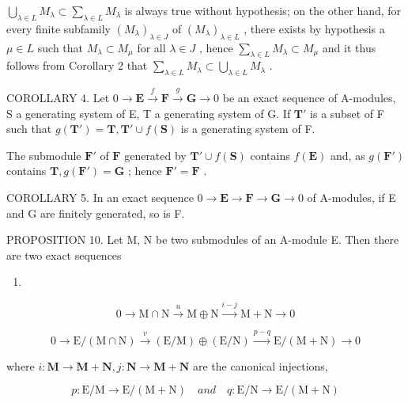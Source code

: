 \(\bigcup_{\lambda \in L} M_{\lambda} \subset \sum_{\lambda \in L} M_{\lambda}\) is always true without hypothesis; on the other hand, for every finite subfamily \((M_{\lambda})_{\lambda \in J}\) of \((M_{\lambda})_{\lambda \in L}\) , there exists by hypothesis a \(\mu \in L\) such that \(M_{\lambda} \subset M_{\mu}\) for all \(\lambda \in J\) , hence \(\sum_{\lambda \in L} M_{\lambda} \subset M_{\mu}\) and it thus follows from Corollary 2 that \(\sum_{\lambda \in L} M_{\lambda} \subset \bigcup_{\lambda \in L} M_{\lambda}\) .

COROLLARY 4. Let \(0 \to \mathbf{E} \xrightarrow{f} \mathbf{F} \xrightarrow{g} \mathbf{G} \to 0\) be an exact sequence of A-modules, S a generating system of E, T a generating system of G. If \(\mathbf{T}'\) is a subset of F such that \(g(\mathbf{T}') = \mathbf{T}, \mathbf{T}' \cup f(\mathbf{S})\) is a generating system of F.

The submodule \(\mathbf{F}'\) of \(\mathbf{F}\) generated by \(\mathbf{T}' \cup f(\mathbf{S})\) contains \(f(\mathbf{E})\) and, as \(g(\mathbf{F}')\) contains \(\mathbf{T}, g(\mathbf{F}') = \mathbf{G}\) ; hence \(\mathbf{F}' = \mathbf{F}\) .

COROLLARY 5. In an exact sequence \(0 \to \mathbf{E} \to \mathbf{F} \to \mathbf{G} \to 0\) of A-modules, if E and G are finitely generated, so is F.

PROPOSITION 10. Let M, N be two submodules of an A-module E. Then there are two exact sequences

\begin{enumerate}
\def\labelenumi{(\arabic{enumi})}
\setcounter{enumi}{28}
\tightlist
\item
\end{enumerate}

\[
0 \longrightarrow \mathrm{M} \cap \mathrm{N} \stackrel {u} {\longrightarrow} \mathrm{M} \oplus \mathrm{N} \stackrel {i - j} {\longrightarrow} \mathrm{M} + \mathrm{N} \longrightarrow 0\tag{30}
\]

\[
0 \longrightarrow \mathrm{E} / (\mathrm{M} \cap \mathrm{N}) \stackrel {v} {\longrightarrow} (\mathrm{E} / \mathrm{M}) \oplus (\mathrm{E} / \mathrm{N}) \stackrel {p - q} {\longrightarrow} \mathrm{E} / (\mathrm{M} + \mathrm{N}) \longrightarrow 0
\]

where \(i:\mathbf{M}\to \mathbf{M} + \mathbf{N},j:\mathbf{N}\rightarrow \mathbf{M} + \mathbf{N}\) are the canonical injections,

\[
p: \mathrm{E} / \mathrm{M} \rightarrow \mathrm{E} / (\mathrm{M} + \mathrm{N}) \quad and \quad q: \mathrm{E} / \mathrm{N} \rightarrow \mathrm{E} / (\mathrm{M} + \mathrm{N})
\]

